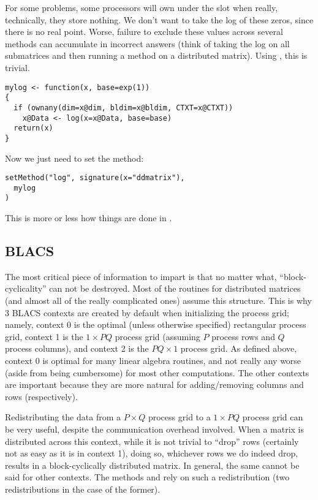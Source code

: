 For some problems, some processors will own  under the  slot when really, technically, they store nothing.  We don't want to take the log of these zeros, since there is no real point.  Worse, failure to exclude these values across several methods can accumulate in incorrect answers (think of taking the log on all submatrices and then running a  method on a distributed matrix).  Using , this is trivial.

\begin{lstlisting}[language=rr,title=Generating in Parallel]
mylog <- function(x, base=exp(1))
{
  if (ownany(dim=x@dim, bldim=x@bldim, CTXT=x@CTXT))
    x@Data <- log(x=x@Data, base=base)
  return(x)
}
\end{lstlisting}

Now we just need to set the method:

\begin{lstlisting}[language=rr,title=Generating in Parallel]
setMethod("log", signature(x="ddmatrix"),
  mylog
)

\end{lstlisting}

This is more or less how things are done in .

\subsection{BLACS}
\label{sec:ictxt}

The most critical piece of information to impart is that no matter what, 
``block-cyclicality'' can not be destroyed.  Most of the routines for 
distributed matrices (and almost all of the really complicated ones) assume this 
structure.  This is why 3 BLACS contexts are created by default when 
initializing the process grid; namely, context 0 is the optimal (unless 
otherwise specified) rectangular process grid, context 1 is the $1\times PQ$ 
process grid (assuming $P$ process rows and $Q$ process columns), and context 2 
is the $PQ\times 1$ process grid.  As defined above, context 0 is optimal for 
many linear algebra routines, and not really any worse (aside from being 
cumbersome) for most other computations.  The other contexts are important 
because they are more natural for adding/removing columns and rows 
(respectively).

Redistributing the data from a $P\times Q$ process grid to a $1\times PQ$ 
process grid can be very useful, despite the communication overhead involved.  
When a matrix is distributed across this context, while it is not trivial to 
``drop'' rows (certainly not as easy as it is in context 1), doing so, whichever 
rows we do indeed drop, results in a block-cyclically distributed matrix.  In 
general, the same cannot be said for other contexts.  The  
methods \code{[} and  rely on such a redistribution (two 
redistributions in the case of the former).
